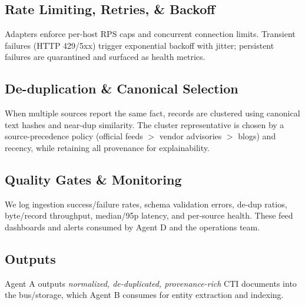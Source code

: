 \subsection{Rate Limiting, Retries, \& Backoff}
Adapters enforce per-host RPS caps and concurrent connection limits. Transient failures (HTTP 429/5xx) trigger exponential backoff with jitter; persistent failures are quarantined and surfaced as health metrics.

\subsection{De-duplication \& Canonical Selection}
When multiple sources report the same fact, records are clustered using canonical text hashes and near-dup similarity. The cluster representative is chosen by a source-precedence policy (official feeds $>$ vendor advisories $>$ blogs) and recency, while retaining all provenance for explainability.

\subsection{Quality Gates \& Monitoring}
We log ingestion success/failure rates, schema validation errors, de-dup ratios, byte/record throughput, median/95p latency, and per-source health. These feed dashboards and alerts consumed by Agent D and the operations team.

\subsection{Outputs}
Agent A outputs \emph{normalized, de-duplicated, provenance-rich} CTI documents into the bus/storage, which Agent B consumes for entity extraction and indexing.
